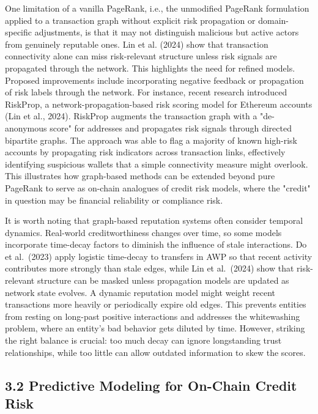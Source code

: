 One limitation of a vanilla PageRank, i.e., the unmodified PageRank formulation applied to a transaction graph without explicit risk propagation or domain-specific adjustments, is that it may not distinguish malicious but active actors from genuinely reputable ones. Lin et al. (2024) show that transaction connectivity alone can miss risk-relevant structure unless risk signals are propagated through the network. This highlights the need for refined models. Proposed improvements include incorporating negative feedback or propagation of risk labels through the network. For instance, recent research introduced RiskProp, a network-propagation-based risk scoring model for Ethereum accounts (Lin et al., 2024). RiskProp augments the transaction graph with a "de-anonymous score" for addresses and propagates risk signals through directed bipartite graphs. The approach was able to flag a majority of known high-risk accounts by propagating risk indicators across transaction links, effectively identifying suspicious wallets that a simple connectivity measure might overlook. This illustrates how graph-based methods can be extended beyond pure PageRank to serve as on-chain analogues of credit risk models, where the "credit" in question may be financial reliability or compliance risk.


It is worth noting that graph-based reputation systems often consider temporal dynamics. Real-world creditworthiness changes over time, so some models incorporate time-decay factors to diminish the influence of stale interactions. Do et al.\ (2023) apply logistic time-decay to transfers in AWP so that recent activity contributes more strongly than stale edges, while Lin et al.\ (2024) show that risk-relevant structure can be masked unless propagation models are updated as network state evolves. A dynamic reputation model might weight recent transactions more heavily or periodically expire old edges. This prevents entities from resting on long-past positive interactions and addresses the whitewashing problem, where an entity's bad behavior gets diluted by time. However, striking the right balance is crucial: too much decay can ignore longstanding trust relationships, while too little can allow outdated information to skew the scores.


\subsection*{3.2 Predictive Modeling for On-Chain Credit Risk}
\label{sec:predictive-modeling-for-on-chain-credit-risk}

